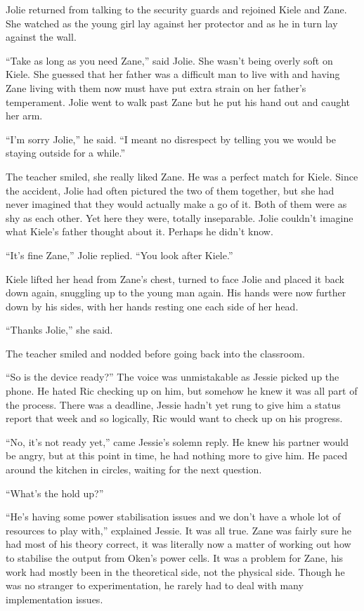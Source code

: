 Jolie returned from talking to the security guards and rejoined Kiele and Zane.  She watched as the young girl lay against her protector and as he in turn lay against the wall.

``Take as long as you need Zane,'' said Jolie.  She wasn't being overly soft on Kiele.  She guessed that her father was a difficult man to live with and having Zane living with them now must have put extra strain on her father's temperament.  Jolie went to walk past Zane but he put his hand out and caught her arm.

``I'm sorry Jolie,'' he said.  ``I meant no disrespect by telling you we would be staying outside for a while.''

The teacher smiled, she really liked Zane.  He was a perfect match for Kiele.  Since the accident, Jolie had often pictured the two of them together, but she had never imagined that they would actually make a go of it.  Both of them were as shy as each other.  Yet here they were, totally inseparable.  Jolie couldn't imagine what Kiele's father thought about it.  Perhaps he didn't know.

``It's fine Zane,'' Jolie replied.  ``You look after Kiele.''

Kiele lifted her head from Zane's chest, turned to face Jolie and placed it back down again, snuggling up to the young man again.  His hands were now further down by his sides, with her hands resting one each side of her head.

``Thanks Jolie,'' she said.

The teacher smiled and nodded before going back into the classroom.  



\thoughtbreak



``So is the device ready?''  The voice was unmistakable as Jessie picked up the phone.  He hated Ric checking up on him, but somehow he knew it was all part of the process.  There was a deadline, Jessie hadn't yet rung to give him a status report that week and so logically, Ric would want to check up on his progress.

``No, it's not ready yet,'' came Jessie's solemn reply.  He knew his partner would be angry, but at this point in time, he had nothing more to give him.  He paced around the kitchen in circles, waiting for the next question.

``What's the hold up?'' 

``He's having some power stabilisation issues and we don't have a whole lot of resources to play with,'' explained Jessie.  It was all true.  Zane was fairly sure he had most of his theory correct, it was literally now a matter of working out how to stabilise the output from Oken's power cells.  It was a problem for Zane, his work had mostly been in the theoretical side, not the physical side.  Though he was no stranger to experimentation, he rarely had to deal with many implementation issues.

